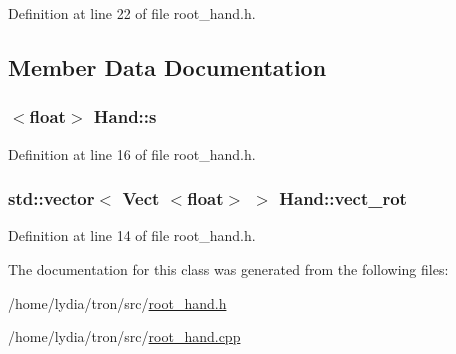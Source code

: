 Definition at line 22 of file root\+\_\+hand.\+h.



\subsection{Member Data Documentation}
\hypertarget{class_hand_adff0a0b12313a9c91d199fe1f254d7af}{
\subsubsection[{s}]{$<$float$>$ Hand\+::s}}\label{class_hand_adff0a0b12313a9c91d199fe1f254d7af}


Definition at line 16 of file root\+\_\+hand.\+h.

\hypertarget{class_hand_aee89f8228c4b91d6b945cfd0ac06a1f4}{
\subsubsection[{vect\+\_\+rot}]{\setlength{\rightskip}{0pt plus 5cm}std\+::vector$<$ {\bf Vect} $<$float$>$ $>$ Hand\+::vect\+\_\+rot}}\label{class_hand_aee89f8228c4b91d6b945cfd0ac06a1f4}


Definition at line 14 of file root\+\_\+hand.\+h.



The documentation for this class was generated from the following files\+:\begin{DoxyCompactItemize}
\item 
/home/lydia/tron/src/\hyperlink{root__hand_8h}{root\+\_\+hand.\+h}\item 
/home/lydia/tron/src/\hyperlink{root__hand_8cpp}{root\+\_\+hand.\+cpp}\end{DoxyCompactItemize}
